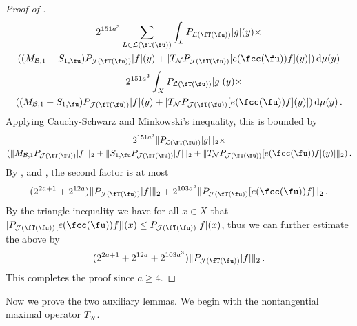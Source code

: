 \begin{proof}[Proof of ]
    \begin{multline*}
        2^{151a^3} \sum_{L \in \mathcal{L}(\fT(\fu))} \int_L P_{\mathcal{L}(\fT(\fu))}|g|(y) \times \\((M_{\mathcal{B},1}+S_{1,\fu})P_{\mathcal{J}(\fT(\fu))}|f|(y)+|T_{\mathcal{N}}P_{\mathcal{J}(\fT(\fu))}[e(\fcc(\fu))f](y)| ) \, \mathrm{d}\mu(y)
    \end{multline*}
    \begin{multline*}
        = 2^{151a^3} \int_X P_{\mathcal{L}(\fT(\fu))}|g|(y)\times \\((M_{\mathcal{B},1}+S_{1,\fu})P_{\mathcal{J}(\fT(\fu))}|f|(y)+|T_{\mathcal{N}}P_{\mathcal{J}(\fT(\fu))}[e(\fcc(\fu))f](y)| ) \, \mathrm{d}\mu(y)\,.
    \end{multline*}
    Applying Cauchy-Schwarz and Minkowski's inequality, this is bounded by
    \begin{multline*}
        2^{151a^3} \|P_{\mathcal{L}(\fT(\fu))}|g|\|_2 \times \\(\|M_{\mathcal{B},1}P_{\mathcal{J}(\fT(\fu))}|f|\|_2 + \|S_{1,\fu}P_{\mathcal{J}(\fT(\fu))}|f|\|_2 + \|T_{\mathcal{N}}P_{\mathcal{J}(\fT(\fu))}[e(\fcc(\fu))f](y)|\|_2)\,.
    \end{multline*}
    By ,  and , the second factor is at most
    $$
        (2^{2a+1} + 2^{12a})\|P_{\mathcal{J}(\fT(\fu))}|f|\|_2 + 2^{103a^3} \|P_{\mathcal{J}(\fT(\fu))}[e(\fcc(\fu))f]\|_2\,.
    $$
    By the triangle inequality we have for all $x \in X$ that $|P_{\mathcal{J}(\fT(\fu))}[e(\fcc(\fu))f]|(x) \le P_{\mathcal{J}(\fT(\fu))}|f|(x)$, thus we can further estimate the above by
    $$
        (2^{2a+1} + 2^{12a} + 2^{103a^3}) \|P_{\mathcal{J}(\fT(\fu))}|f|\|_2\,.
    $$
    This completes the proof since $a \ge 4$.
\end{proof}

Now we prove the two auxiliary lemmas. We begin with the nontangential maximal operator $T_{\mathcal{N}}$.

